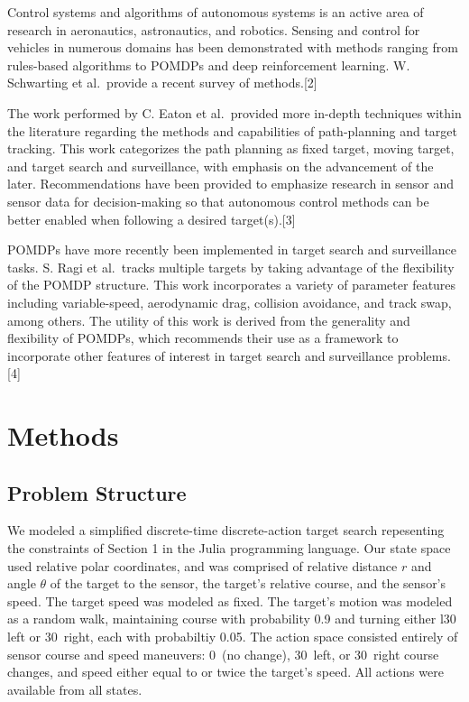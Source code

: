 \documentclass{article}
\begin{document}
\par Control systems and algorithms of autonomous systems is an active area of research in aeronautics, astronautics, and robotics. Sensing and control for vehicles in numerous domains has been demonstrated with methods ranging from rules-based algorithms to POMDPs and deep reinforcement learning. W. Schwarting et al.\ provide a recent survey of methods.[2]

\par The work performed by C. Eaton et al.\ provided more in-depth techniques within the literature regarding the methods and capabilities of path-planning and target tracking. This work categorizes the path planning as fixed target, moving target, and target search and surveillance, with emphasis on the advancement of the later. Recommendations have been provided to emphasize research in sensor and sensor data for decision-making so that autonomous control methods can be better enabled when following a desired target(s).[3]

\par POMDPs have more recently been implemented in target search and surveillance tasks. S. Ragi et al.\ tracks multiple targets by taking advantage of the flexibility of the POMDP structure. This work incorporates a variety of parameter features including variable-speed, aerodynamic drag, collision avoidance, and track swap, among others. The utility of this work is derived from the generality and flexibility of POMDPs, which recommends their use as a framework to incorporate other features of interest in target search and surveillance problems.[4]


\section{Methods}
\label{headings}
\subsection{Problem Structure}
\par We modeled a simplified discrete-time discrete-action target search repesenting the constraints of Section 1 in the Julia programming language. Our state space used relative polar coordinates, and was comprised of relative distance $r$ and angle $\theta$ of the target to the sensor, the target's relative course, and the sensor's speed. The target speed was modeled as fixed. The target's motion was modeled as a random walk, maintaining course with probability 0.9 and turning either l30\textdegree \,  left or 30\textdegree \, right, each with probabiltiy 0.05. The action space consisted entirely of sensor course and speed maneuvers: 0\textdegree \, (no change),  30\textdegree \,  left,  or 30\textdegree \, right course changes, and speed either equal to or twice the target's speed. All actions were available from all states.
\end{document}

